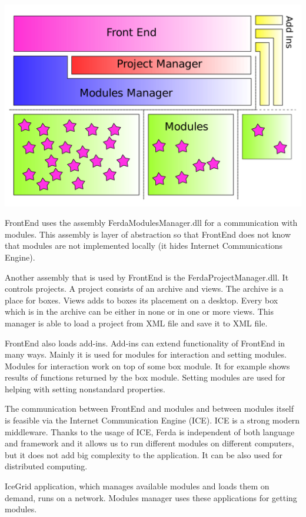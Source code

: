 \documentclass[a4paper,12pt]{book}
\begin{document}
\noindent\includegraphics[width=13.72cm]{designB}

FrontEnd uses the assembly FerdaModulesManager.dll for a communication with modules. This assembly is layer of abstraction so that FrontEnd does not know that modules are not implemented locally (it hides Internet Communications Engine).

Another assembly that is used by FrontEnd is the FerdaProjectManager.dll. It controls projects. A project consists of an archive and views. The archive is a place for boxes. Views adds to boxes its placement on a desktop. Every box which is in the archive can be either in none or in one or more views. This manager is able to load a project from XML file and save it to XML file.

FrontEnd also loads add-ins. Add-ins can extend functionality of FrontEnd in many ways. Mainly it is used for modules for interaction and setting modules. Modules for interaction work on top of some box module. It for example shows results of functions returned by the box module. Setting modules are used for helping with setting nonstandard properties.

The communication between FrontEnd and modules and between modules itself is feasible via the Internet Communication Engine (ICE). ICE is a strong modern middleware. Thanks to the usage of ICE, Ferda is independent of both language and framework and it allows us to run different modules on different computers, but it does not add big complexity to the application. It can be also used for distributed computing.

IceGrid application, which manages available modules and loads them on demand, runs on a network. Modules manager uses these applications for getting modules.
\end{document}
